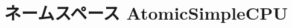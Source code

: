 \hypertarget{namespaceAtomicSimpleCPU}{
\section{ネームスペース AtomicSimpleCPU}
\label{namespaceAtomicSimpleCPU}
}
